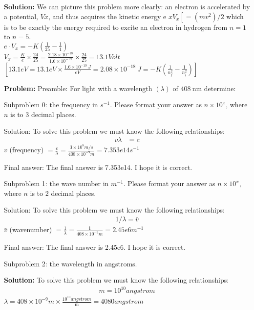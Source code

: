 \documentclass[10pt]{article}
\begin{document}
\textbf{Solution:}
We can picture this problem more clearly: an electron is accelerated by a potential, $V x$, and thus acquires the kinetic energy e $x V_{x}\left[=\left(m v^{2}\right) / 2\right.$ which is to be exactly the energy required to excite an electron in hydrogen from $n=1$ to $n=5$.\\
${e} \cdot {V}_{{x}} =-{K}\left(\frac{1}{25}-\frac{1}{1}\right) $\\
${V}_{{x}} =\frac{{K}}{{e}} \times \frac{24}{25}=\frac{2.18 \times 10^{-18}}{1.6 \times 10^{-19}} \times \frac{24}{25}= \boxed{13.1} {Volt}$ \\
${\left[13.1 {eV}=13.1 {eV} \times \frac{1.6 \times 10^{-19} {~J}}{{eV}}=2.08 \times 10^{-18} {~J}=-{K}\left(\frac{1}{{n}_{{f}}^{2}}-\frac{1}{{n}_{{i}}^{2}}\right)\right]}$ 


\textbf{Problem:}
Preamble: For light with a wavelength $(\lambda)$ of $408 \mathrm{~nm}$ determine:

Subproblem 0: the frequency in $s^{-1}$. Please format your answer as $n \times 10^x$, where $n$ is to 3 decimal places. 


Solution: To solve this problem we must know the following relationships:
\[
\begin{aligned}
v \lambda &=c
\end{aligned}
\]
$v$ (frequency) $=\frac{c}{\lambda}=\frac{3 \times 10^{8} m / s}{408 \times 10^{-9} m}= \boxed{7.353e14} s^{-1}$

Final answer: The final answer is 7.353e14. I hope it is correct.

Subproblem 1: the wave number in $m^{-1}$. Please format your answer as $n \times 10^x$, where $n$ is to 2 decimal places.


Solution: To solve this problem we must know the following relationships:
\[
\begin{aligned}
1 / \lambda=\bar{v} 
\end{aligned}
\]
$\bar{v}$ (wavenumber) $=\frac{1}{\lambda}=\frac{1}{408 \times 10^{-9} m}=\boxed{2.45e6} m^{-1}$

Final answer: The final answer is 2.45e6. I hope it is correct.

Subproblem 2: the wavelength in angstroms. 


\textbf{Solution:}
To solve this problem we must know the following relationships:
\[
\begin{aligned}
m =10^{10} angstrom
\end{aligned}
\]
$\lambda=408 \times 10^{-9} m \times \frac{10^{10} angstrom}{\mathrm{m}}=\boxed{4080} angstrom$
\end{document}
